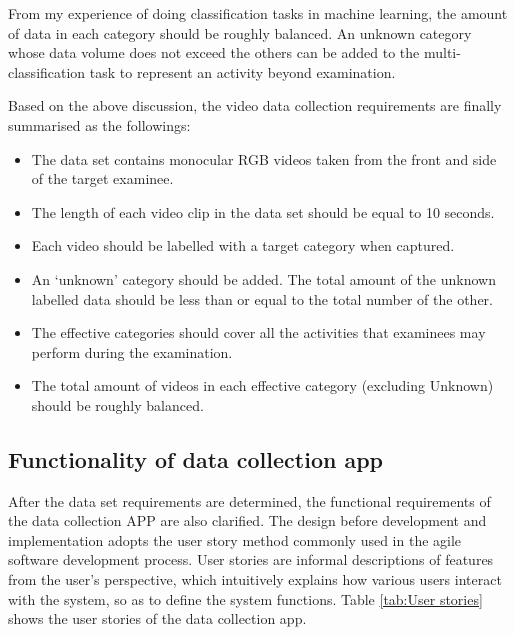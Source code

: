From my experience of doing classification tasks in machine learning, the amount of data in each category should be roughly balanced.
An unknown category whose data volume does not exceed the others can be added to the multi-classification task to represent an activity beyond examination.

Based on the above discussion, the video data collection requirements are finally summarised as the followings:

\begin{itemize}
    \item The data set contains monocular RGB videos taken from the front and side of the target examinee.
    \item The length of each video clip in the data set should be equal to 10 seconds.
    \item Each video should be labelled with a target category when captured.
    \item An `unknown' category should be added. The total amount of the unknown labelled data should be less than or equal to the total number of the other.
    \item The effective categories should cover all the activities that examinees may perform during the examination.
    \item The total amount of videos in each effective category (excluding Unknown) should be roughly balanced.
\end{itemize}

\subsection{Functionality of data collection app}
After the data set requirements are determined, the functional requirements of the data collection APP are also clarified.
The design before development and implementation adopts the user story method commonly used in the agile software development process.
User stories are informal descriptions of features from the user's perspective, which intuitively explains how various users interact with the system, so as to define the system functions.
Table \ref{tab:User stories} shows the user stories of the data collection app.

